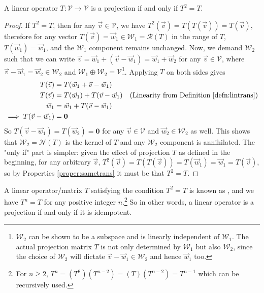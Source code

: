 \begin{proper}[Projection]
\label{proper:matrixproj}
A linear operator $T: \mathcal{V} \to \mathcal{V}$ is a projection if and only if $T^2 = T$.
\end{proper}
\begin{proof}
If $T^2 = T$, then for any $\vec{v} \in \mathcal{V}$, we have $T^2(\vec{v}) = T(T(\vec{v})) = T(\vec{v})$, therefore for any vector $T(\vec{v}) = \vec{w}_1 \in \mathcal{W}_1 = \mathcal{R}(T)$ in the range of $T$, $T(\vec{w}_1) = \vec{w}_1$, and the $\mathcal{W}_1$ component remains unchanged. Now, we demand $\mathcal{W}_2$ such that we can write $\vec{v} = \vec{w}_1 + (\vec{v} - \vec{w}_1) = \vec{w}_1 + \vec{w}_2$ for any $\vec{v} \in \mathcal{V}$, where $\vec{v} - \vec{w}_1 = \vec{w}_2 \in \mathcal{W}_2$ and $\mathcal{W}_1 \oplus \mathcal{W}_2 = \mathcal{V}$\footnote{$\mathcal{W}_2$ can be shown to be a subspace and is linearly independent of $\mathcal{W}_1$. The actual projection matrix $T$ is not only determined by $\mathcal{W}_1$ but also $\mathcal{W}_2$, since the choice of $\mathcal{W}_2$ will dictate $\vec{v} - \vec{w}_1 \in \mathcal{W}_2$ and hence $\vec{w}_1$ too.}. Applying $T$ on both sides gives 
\begin{align*}
T(\vec{v}) &= T(\vec{w}_1 + \vec{v} - \vec{w}_1) \\
T(\vec{v}) &= T(\vec{w}_1) + T(\vec{v} - \vec{w}_1) & \text{(Linearity from Definition \ref{defn:lintrans})}\\
\vec{w}_1 &= \vec{w}_1 + T(\vec{v} - \vec{w}_1) \\
\implies T(\vec{v} - \vec{w}_1) &= \textbf{0}
\end{align*}
So $T(\vec{v} - \vec{w}_1) = T(\vec{w}_2) = \textbf{0}$ for any $\vec{v} \in \mathcal{V}$ and $\vec{w}_2 \in \mathcal{W}_2$ as well. This shows that $\mathcal{W}_2 = \mathcal{N}(T)$ is the kernel of $T$ and any $\mathcal{W}_2$ component is annihilated. The "only if" part is simpler: given the effect of projection $T$ as defined in the beginning, for any arbitrary $\vec{v}$, $T^2(\vec{v}) = T(T(\vec{v})) = T(\vec{w}_1) = \vec{w}_1 = T(\vec{v})$, so by Properties \ref{proper:sametrans} it must be that $T^2 = T$.
\end{proof}
A linear operator/matrix $T$ satisfying the condition $T^2 = T$ is known as , and we have $T^n = T$ for any positive integer $n$.\footnote{For $n \geq 2$, $T^n = (T^2) (T^{n-2}) = (T) (T^{n-2}) = T^{n-1}$ which can be recursively used.} So in other words, a linear operator is a projection if and only if it is idempotent.

